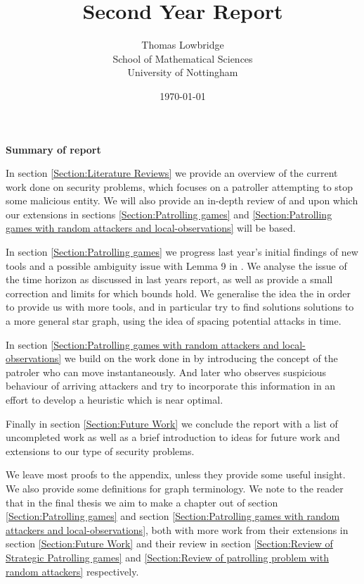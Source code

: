 \documentclass[a4paper,10pt]{article}
\title{Second Year Report}
\date{\today}
\author{Thomas Lowbridge \\ School of Mathematical Sciences \\ University of Nottingham}
\theoremstyle{definition}
\theoremstyle{definition}
\theoremstyle{remark}
\theoremstyle{definition}
\begin{document}
\pagestyle{empty}
{
  \renewcommand{\thispagestyle}[1]{}
  \maketitle
  \tableofcontents  
}
\clearpage
\pagestyle{plain}


\setlength{\parindent}{0pt}
\setlength{\parskip}{1em}

\newpage
{}

\pagestyle{empty}
{
\begin{center}
\begin{Huge}
\textbf{Summary of report}
\end{Huge}
\end{center}


In section \ref{Section:Literature Reviews} we provide an overview of the current work done on security problems, which focuses on a patroller attempting to stop some malicious entity. We will also provide an in-depth review of \cite{Alpern2011} and \cite{Lin2013} upon which our extensions in sections \ref{Section:Patrolling games} and \ref{Section:Patrolling games with random attackers and local-observations} will be based.

In section \ref{Section:Patrolling games} we progress last year's initial findings of new tools and a possible ambiguity issue with Lemma 9 in \cite{Alpern2011}. We analyse the issue of the time horizon as discussed in last years report, as well as provide a small correction and limits for which bounds hold. We generalise the idea the in order to provide us with more tools, and in particular try to find solutions solutions to a more general star graph, using the idea of spacing potential attacks in time.

In section \ref{Section:Patrolling games with random attackers and local-observations} we build on the work done in \cite{Lin2013} by introducing the concept of the patroler who can move instantaneously. And later who observes suspicious behaviour of arriving attackers and try to incorporate this information in an effort to develop a heuristic which is near optimal.

Finally in section \ref{Section:Future Work} we conclude the report with a list of uncompleted work as well as a brief introduction to ideas for future work and extensions to our type of security problems. 

We leave most proofs to the appendix, unless they provide some useful insight. We also provide some definitions for graph terminology. We note to the reader that in the final thesis we aim to make a chapter out of section \ref{Section:Patrolling games} and section \ref{Section:Patrolling games with random attackers and local-observations}, both with more work from their extensions in section \ref{Section:Future Work} and their review in section \ref{Section:Review of Strategic Patrolling games} and \ref{Section:Review of patrolling problem with random attackers} respectively.
}
\clearpage
\pagestyle{plain}
\end{document}
